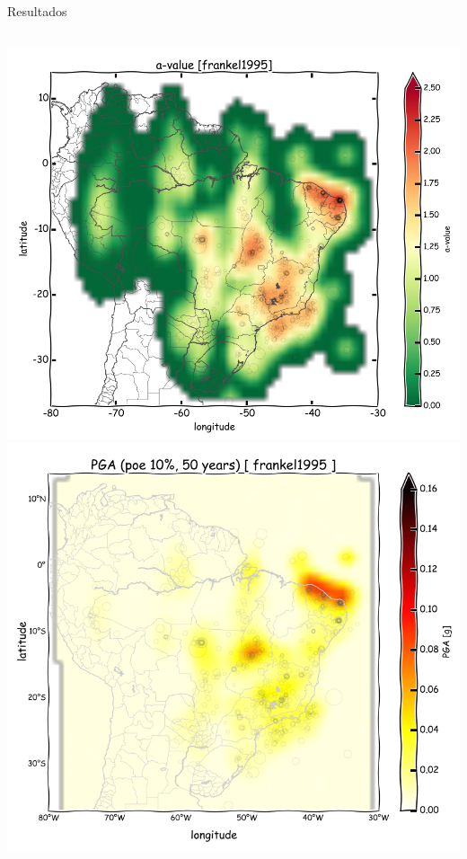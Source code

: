 \documentclass[ucs,8pt]{beamer}
\begin{document}
\begin{frame}{Resultados}
\begin{columns}
	\begin{column}[T]{.24\textwidth}
		\includegraphics[width=1\textwidth]{a_frankel_br} \\
		\includegraphics[width=1\textwidth]{pga_frankel}
	\end{column}
	

\end{columns}
\end{frame}
\end{document}
